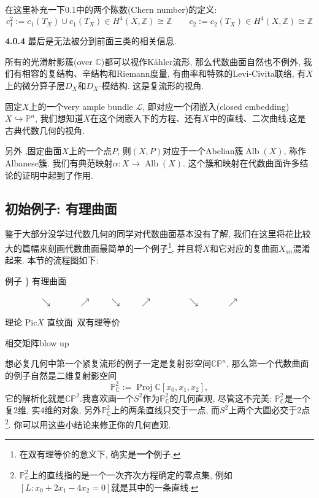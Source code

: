 \documentclass[UTF8,12pt,twoside]{article}
\theoremstyle{definition}
\newcommand{\ZZ}{\mathbb{Z}}  %
\newcommand{\CC}{\mathbb{C}}  %
\newcommand{\Proj}{\operatorname{Proj}}
\newcommand{\Alb}{\operatorname{Alb}}
\numberwithin{equation}{section}
\begin{document}
在这里补充一下0.1中的两个陈数(Chern number)的定义: 
$$c_1^2:=c_1(T_X) \cup c_1(T_X) \in H^4(X,\ZZ) \cong \ZZ \qquad c_2:=c_2(T_X) \in H^4(X,\ZZ) \cong \ZZ$$

\textbf{4.0.4} 最后是无法被分到前面三类的相关信息.

所有的光滑射影簇(over $\CC$)都可以视作Kähler流形, 那么代数曲面自然也不例外, 我们有相容的复结构、辛结构和Riemann度量, 有曲率和特殊的Levi-Civita联络, 有$X$上的微分算子层$D_X$和$D_X$-模结构. 这是复流形的视角.

固定$X$上的一个very ample bundle $\mathcal{L}$, 即对应一个闭嵌入(closed embedding)$X \hookrightarrow \mathbb{P}^n$, 我们想知道$X$在这个闭嵌入下的方程、还有$X$中的直线、二次曲线.这是古典代数几何的视角.

另外 ,固定曲面$X$上的一个点$P$, 则$(X,P)$对应于一个Abelian簇$\Alb(X)$, 称作Albanese簇. 我们有典范映射$\alpha:X \longrightarrow \Alb(X)$. 这个簇和映射在代数曲面许多结论的证明中起到了作用.

\subsection{初始例子: 有理曲面}

鉴于大部分没学过代数几何的同学对代数曲面基本没有了解, 我们在这里将花比较大的篇幅来刻画代数曲面最简单的一个例子\footnote{在双有理等价的意义下, 确实是\textbf{一个}例子.}, 并且将$X$和它对应的复曲面$X_{an}$混淆起来. 本节的流程图如下: 



例子\quad {}  \textcolor[RGB]{102,102,102}{ {\Big\}} 有理曲面}

$\quad\quad\quad\quad\searrow\quad\quad\quad\nearrow\quad\quad\searrow \quad\quad\nearrow\quad\quad\quad\quad
\searrow\quad\quad\quad \nearrow $

理论\quad\quad\quad\; $\mathrm{Pic}X$\quad\quad\quad\;\; 直纹面\quad\quad\quad\quad\, 双有理等价

\quad\quad\quad\quad\;
相交矩阵\quad\quad\quad\quad\quad\quad\quad\quad\quad\quad\quad blow up



想必复几何中第一个紧复流形的例子一定是复射影空间$\mathbb{CP}^n$, 那么第一个代数曲面的例子自然是二维复射影空间
$$\mathbb{P}_{\CC}^2:= \Proj \CC[x_0,x_1,x_2], $$
它的解析化就是$\mathbb{CP}^2$.我喜欢画一个$S^2$作为$\mathbb{P}_{\CC}^2$的几何直观, 尽管这不完美: $\mathbb{P}_{\CC}^2$是一个复$2$维, 实$4$维的对象, 另外$\mathbb{P}_{\CC}^2$上的两条直线只交于一点, 而$S^2$上两个大圆必交于2点\footnote{$\mathbb{P}_{\CC}^2$上的直线指的是一个一次齐次方程确定的零点集, 例如$[L:x_0+2x_1-4x_2=0]$就是其中的一条直线.}. 你可以用这些小结论来修正你的几何直观.
\end{document}
